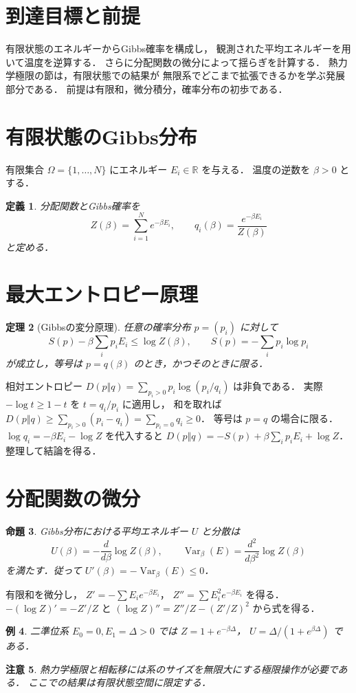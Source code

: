 \documentclass[a5paper,10pt,onecolumn]{jsarticle}
\makeatletter
\theoremstyle{mathnotetheorem}
\newtheorem{theorem}{定理}[section]
\newtheorem{definition}[theorem]{定義}
\newtheorem{proposition}[theorem]{命題}
\newtheorem{example}[theorem]{例}
\newtheorem{remark}[theorem]{注意}
\renewcommand{\proofname}{証明}
\renewenvironment{proof}[1][\proofname]{%
  \par\pushQED{\qed}\normalfont\topsep4\p@\@plus2\p@\relax
  \trivlist\item[\hskip\labelsep\bfseries #1]\ignorespaces
}{\popQED\endtrivlist\@endpefalse}
\makeatother
\begin{document}
\section*{到達目標と前提}
有限状態のエネルギーからGibbs確率を構成し，
観測された平均エネルギーを用いて温度を逆算する．
さらに分配関数の微分によって揺らぎを計算する．
熱力学極限の節は，有限状態での結果が
無限系でどこまで拡張できるかを学ぶ発展部分である．
前提は有限和，微分積分，確率分布の初歩である．

\section{有限状態のGibbs分布}
有限集合 $\Omega=\{1,\ldots,N\}$ にエネルギー $E_i\in\mathbb R$ を与える．
温度の逆数を $\beta>0$ とする．
\begin{definition}
分配関数とGibbs確率を
\[
 Z(\beta)=\sum_{i=1}^Ne^{-\beta E_i},\qquad
 q_i(\beta)=\frac{e^{-\beta E_i}}{Z(\beta)}
\]
と定める．
\end{definition}
\section{最大エントロピー原理}
\begin{theorem}[Gibbsの変分原理]
任意の確率分布 $p=(p_i)$ に対して
\[
 S(p)-\beta\sum_i p_iE_i\le\log Z(\beta),\qquad
 S(p)=-\sum_i p_i\log p_i
\]
が成立し，等号は $p=q(\beta)$ のとき，かつそのときに限る．
\end{theorem}
\begin{proof}
相対エントロピー
$D(p\Vert q)=\sum_{p_i>0}p_i\log(p_i/q_i)$ は非負である．
実際 $-\log t\ge1-t$ を $t=q_i/p_i$ に適用し，
和を取れば $D(p\Vert q)\ge\sum_{p_i>0}(p_i-q_i)
=\sum_{p_i=0}q_i\ge0$．
等号は $p=q$ の場合に限る．
$\log q_i=-\beta E_i-\log Z$ を代入すると
$D(p\Vert q)=-S(p)+\beta\sum_i p_iE_i+\log Z$．
整理して結論を得る．
\end{proof}
\section{分配関数の微分}
\begin{proposition}
Gibbs分布における平均エネルギー $U$ と分散は
\[
 U(\beta)=-\frac{d}{d\beta}\log Z(\beta),\qquad
 \operatorname{Var}_\beta(E)=\frac{d^2}{d\beta^2}\log Z(\beta)
\]
を満たす．従って $U'(\beta)=-\operatorname{Var}_\beta(E)\le0$．
\end{proposition}
\begin{proof}
有限和を微分し，
$Z'=-\sum E_ie^{-\beta E_i}$，
$Z''=\sum E_i^2e^{-\beta E_i}$ を得る．
$-(\log Z)'=-Z'/Z$ と
$(\log Z)''=Z''/Z-(Z'/Z)^2$ から式を得る．
\end{proof}
\begin{example}
二準位系 $E_0=0,E_1=\Delta>0$ では
$Z=1+e^{-\beta\Delta}$，
$U=\Delta/(1+e^{\beta\Delta})$ である．
\end{example}
\begin{remark}
熱力学極限と相転移には系のサイズを無限大にする極限操作が必要である．
ここでの結果は有限状態空間に限定する．
\end{remark}
\end{document}
